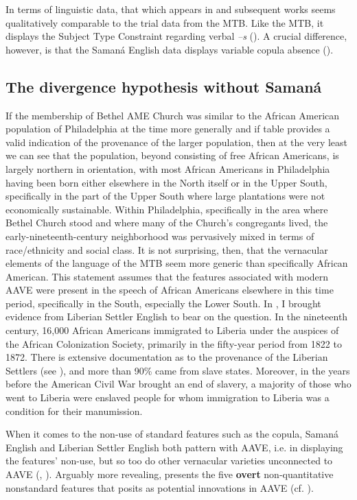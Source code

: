 \documentclass[output=paper,colorlinks,citecolor=brown]{langscibook}
\begin{document}
In terms of linguistic data, that which appears in \citet{PoplackSankoff1987} and subsequent works seems qualitatively comparable to the trial data from the MTB. Like the MTB, it displays the Subject Type Constraint regarding verbal \textit{–s} (\citealt{PoplackTagliamonte1989}). A crucial difference, however, is that the Samaná English data displays variable copula absence (\citealt{PoplackSankoff1987}). 
 

\subsection{The divergence hypothesis without {Samaná}}

If the membership of Bethel AME Church was similar to the African American population of Philadelphia at the time more generally and if  table provides a valid indication of the provenance of the larger population, then at the very least we can see that the population, beyond consisting of free African Americans, is largely northern in orientation, with most African Americans in Philadelphia having been born either elsewhere in the North itself or in the Upper South, specifically in the part of the Upper South where large plantations were not economically sustainable. Within Philadelphia, specifically in the area where Bethel Church stood and where many of the Church’s congregants lived, the early-nineteenth-century neighborhood was pervasively mixed in terms of race/ethnicity and social class. It is not surprising, then, that the vernacular elements of the language of the MTB seem more generic than specifically African American. This statement assumes that the features associated with modern AAVE were present in the speech of African Americans elsewhere in this time period, specifically in the South, especially the Lower South. In \citet{Singler2007part1, Singler2015}, I brought evidence from Liberian Settler English to bear on the question. In the nineteenth century, 16,000 African Americans immigrated to Liberia under the auspices of the African Colonization Society, primarily in the fifty-year period from 1822 to 1872. There is extensive documentation as to the provenance of the Liberian Settlers (see \citealt{Singler1989}), and more than 90\% came from slave states. Moreover, in the years before the American Civil War brought an end of slavery, a majority of those who went to Liberia were enslaved people for whom immigration to Liberia was a condition for their manumission. 

When it comes to the non-use of standard features such as the copula, Samaná English and Liberian Settler English both pattern with AAVE, i.e. in displaying the features’ non-use, but so too do other vernacular varieties unconnected to AAVE (\citealt{Chambers2004}, \citealt{SzmrecsanyiKortmann2009}).  Arguably more revealing,  presents the five \textbf{overt} non-quantitative nonstandard features that \citet{Myhill1995} posits as potential innovations in AAVE (cf. \citealt{Singler2007part2,Singler2015} ). 
\end{document}
